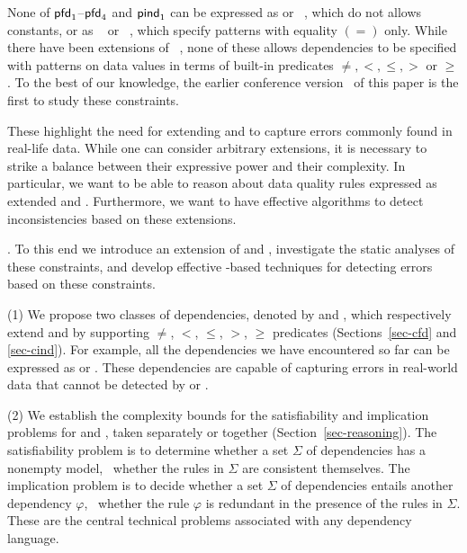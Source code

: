 \vspace{-0.5ex}

None of ${\mathsf{pfd}}_1$--${\mathsf{pfd}}_4$ and ${\mathsf{pind}}_1$
can be expressed as
\FDs or \INDs~\cite{AbHuVi1995}, which do not allows constants,
or as \CFDs~\cite{CFDs} or \CINDs~\cite{tcs-CINDs}, which specify
patterns with  equality $(=)$ only. While there have been
extensions of \CFDs~\cite{icde08,divesh08,ChenFM09}, none of these allows
dependencies to be specified with patterns on data values in terms of
built-in predicates $\ne, <, \le, >$ or $\ge$.  To the best of our
knowledge, the earlier conference version~\cite{dexaChenFM09} of this paper is the first to study these constraints.



These highlight the
need for extending \CFDs and \CINDs to capture errors
commonly found in real-life data.
While one can consider arbitrary extensions,
it is necessary to strike a balance between their expressive power and their complexity.
In particular, we want to be able to reason about data quality rules
expressed as extended \CFDs and \CINDs. Furthermore, we want to
have effective algorithms to detect inconsistencies
based on these extensions.


.
To this end we introduce an extension of  \CFDs and \CINDs, investigate the static analyses of these constraints, and develop
effective \SQL-based techniques for detecting errors based on these constraints.

\sstab
\noindent(1) We propose two classes of dependencies, denoted by
\pCFDs and \pCINDs, which respectively extend \CFDs and \CINDs by supporting
$\ne$, $<$, $\le$, $>$, $\ge$ predicates (Sections~\ref{sec-cfd} and \ref{sec-cind}). For example, all
the dependencies we have encountered so far can be expressed as
\pCFDs or \pCINDs. These dependencies are capable of capturing
errors
in real-world data that cannot be detected by \CFDs or \CINDs.

\sstab
\noindent(2) We establish the complexity bounds for  the satisfiability and
implication problems for \pCFDs and \pCINDs,
taken separately or together (Section~\ref{sec-reasoning}). The
satisfiability problem is to determine whether a set $\Sigma$ of
dependencies has a nonempty model, \ie~whether the rules in $\Sigma$
are consistent themselves. The implication problem is to decide whether
a set $\Sigma$ of dependencies entails another dependency $\varphi$,
\ie~whether the rule $\varphi$ is redundant in the presence of
the rules in $\Sigma$. These are the central technical problems
associated with any dependency language.


